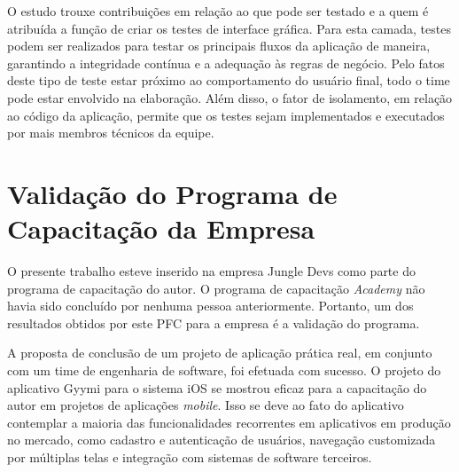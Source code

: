 O estudo trouxe contribuições em relação ao que pode ser testado e a quem é atribuída a função de criar os testes de interface gráfica. Para esta camada, testes podem ser realizados para testar os principais fluxos da aplicação de maneira, garantindo a integridade contínua e a adequação às regras de negócio. Pelo fatos deste tipo de teste estar próximo ao comportamento do usuário final, todo o time pode estar envolvido na elaboração. Além disso, o fator de isolamento, em relação ao código da aplicação, permite que os testes sejam implementados e executados por mais membros técnicos da equipe.

\section{Validação do Programa de Capacitação da Empresa}
O presente trabalho esteve inserido na empresa Jungle Devs como parte do programa de capacitação do autor. O programa de capacitação \textit{Academy} não havia sido concluído por nenhuma pessoa anteriormente. Portanto, um dos resultados obtidos por este PFC para a empresa é a validação do programa.

A proposta de conclusão de um projeto de aplicação prática real, em conjunto com um time de engenharia de software, foi efetuada com sucesso. O projeto do aplicativo Gyymi para o sistema iOS se mostrou eficaz para a capacitação do autor em projetos de aplicações \textit{mobile}. Isso se deve ao fato do aplicativo contemplar a maioria das funcionalidades recorrentes em aplicativos em produção no mercado, como cadastro e autenticação de usuários, navegação customizada por múltiplas telas e integração com sistemas de software terceiros.

